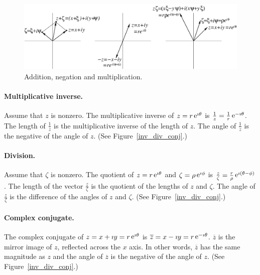 \begin{figure}[h!]
  \begin{center}
      \includegraphics[width=\textwidth]{fcv/number/add_neg_mult}
  \end{center}
  \caption{Addition, negation and multiplication.}
  \label{add_neg_mult}
\end{figure}







\paragraph{Multiplicative inverse.}
Assume that $z$ is nonzero.  The multiplicative inverse of 
$z = r \mathop{\mathrm{e}}\nolimits^{\imath \theta}$ is $\frac{1}{z} = \frac{1}{r} \mathop{\mathrm{e}}\nolimits^{-\imath \theta}$.
The length of $\frac{1}{z}$ is the multiplicative inverse of the length
of $z$.  The angle of $\frac{1}{z}$ is the negative of the angle of $z$.
(See Figure~\ref{inv_div_conj}.)







\paragraph{Division.}
Assume that $\zeta$ is nonzero.
The quotient of $z = r \mathop{\mathrm{e}}\nolimits^{\imath \theta}$ and $\zeta = \rho \mathop{\mathrm{e}}\nolimits^{\imath \phi}$ is
$\frac{z}{\zeta} = \frac{r}{\rho} \mathop{\mathrm{e}}\nolimits^{ \imath (\theta - \phi)}$.  The length of 
the vector $\frac{z}{\zeta}$ is the quotient of the lengths of 
$z$ and $\zeta$.  The angle of $\frac{z}{\zeta}$ is the difference of the 
angles of $z$ and $\zeta$.
(See Figure~\ref{inv_div_conj}.)





\paragraph{Complex conjugate.}
The complex conjugate of $z = x + \imath y = r \mathop{\mathrm{e}}\nolimits^{\imath \theta}$ is 
$\overline{z} = x - \imath y = r \mathop{\mathrm{e}}\nolimits^{-\imath \theta}$.  $\overline{z}$ is the mirror image of
$z$, reflected across the $x$ axis.  In other words, $\overline{z}$ has the
same magnitude as $z$ and the angle of $\overline{z}$ is the negative of 
the angle of $z$.
(See Figure~\ref{inv_div_conj}.)

